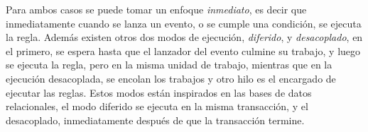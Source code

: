 Para ambos casos se puede tomar un enfoque \emph{inmediato}, es decir que
inmediatamente cuando se lanza un evento, o se cumple una condición, se ejecuta
la regla. Además existen otros dos modos de ejecución, \emph{diferido}, y
\emph{desacoplado}, en el primero, se espera hasta que el lanzador del evento
culmine su trabajo, y luego se ejecuta la regla, pero en la misma unidad de
trabajo, mientras que en la ejecución desacoplada, se encolan los trabajos y
otro hilo es el encargado de ejecutar las reglas. Estos modos están inspirados
en las bases de datos relacionales, el modo diferido se ejecuta en la misma
transacción, y el desacoplado, inmediatamente después de que la transacción
termine\cite{bailey2004event}.
